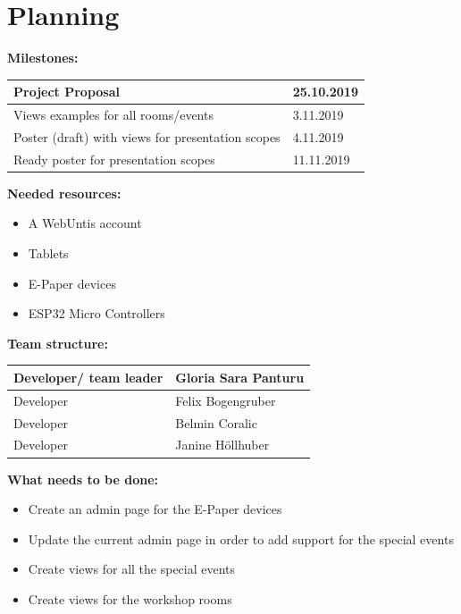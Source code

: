 \documentclass{article}
\begin{document}
\section{Planning}

\textbf{Milestones:}

\begin{center}
\begin{tabular}{|l|l|}
\hline
Project Proposal & 25.10.2019 \\ \hline
Views examples for all rooms/events & 3.11.2019 \\ \hline
Poster (draft) with views for presentation scopes & 4.11.2019 \\ \hline
Ready poster for presentation scopes & 11.11.2019 \\ \hline
\end{tabular}    
\end{center}

\vspace{0.5cm}

\textbf{Needed resources:}
\begin{itemize}
    \item A WebUntis account
    \item Tablets
    \item E-Paper devices
    \item ESP32 Micro Controllers
\end{itemize}

\vspace{0.5cm}

\textbf{Team structure:}
\begin{center}
    \begin{tabular}{|l|l|}
    \hline
       Developer/ team leader  &  Gloria Sara Panturu\\ \hline
        Developer & Felix Bogengruber \\ \hline
        Developer & Belmin Coralic \\ \hline
        Developer & Janine Höllhuber \\ \hline
    \end{tabular}
\end{center}

\textbf{What needs to be done:}
\begin{itemize}
    \item Create an admin page for the E-Paper devices
    \item Update the current admin page in order to add support for the special events
    \item Create views for all the special events
    \item Create views for the workshop rooms
\end{itemize}
\end{document}
